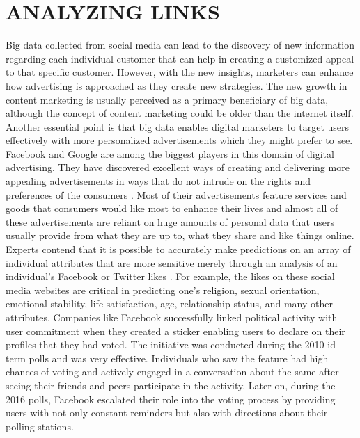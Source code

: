 \documentclass[sigconf]{acmart}
\begin{document}
\section{ANALYZING LINKS}

Big data collected from social media can lead to the discovery of new information regarding each individual customer that can help in creating a customized appeal to that specific customer. However, with the new insights, marketers can enhance how advertising is approached as they create new strategies. The new growth in content marketing is usually perceived as a primary beneficiary of big data, although the concept of content marketing could be older than the internet itself. \\
Another essential point is that big data enables digital marketers to target users effectively with more personalized advertisements which they might prefer to see. Facebook and Google are among the biggest players in this domain of digital advertising. They have discovered excellent ways of creating and delivering more appealing advertisements in ways that do not intrude on the rights and preferences of the consumers \cite{Mangold&Faulds2009}. Most of their advertisements feature services and goods that consumers would like most to enhance their lives and almost all of these advertisements are reliant on huge amounts of personal data that users usually provide from what they are up to, what they share and like things online. \\
Experts contend that it is possible to accurately make predictions on an array of individual attributes that are more sensitive merely through an analysis of an individual’s Facebook or Twitter likes \cite{Nate2014}. For example, the likes on these social media websites are critical in predicting one’s religion, sexual orientation, emotional stability, life satisfaction, age, relationship status, and many other attributes. Companies like Facebook successfully linked political activity with user commitment when they created a sticker enabling users to declare on their profiles that they had voted. The initiative was conducted during the 2010 id term polls and was very effective. Individuals who saw the feature had high chances of voting and actively engaged in a conversation about the same after seeing their friends and peers participate in the activity. Later on, during the 2016 polls, Facebook escalated their role into the voting process by providing users with not only constant reminders but also with directions about their polling stations.
\end{document}
